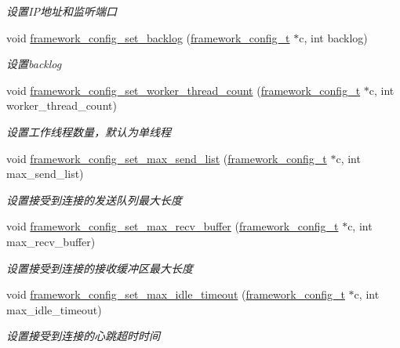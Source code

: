 \begin{DoxyCompactItemize}
\begin{DoxyCompactList}\small\item\em 设置\+I\+P地址和监听端口 \end{DoxyCompactList}\item 
void \hyperlink{a00093_gafdcba98785a6e0c7729c14eac004c1e3_gafdcba98785a6e0c7729c14eac004c1e3}{framework\+\_\+config\+\_\+set\+\_\+backlog} (\hyperlink{a00047_a55b26efa9e6ee05514d087ba2593a54b_a55b26efa9e6ee05514d087ba2593a54b}{framework\+\_\+config\+\_\+t} $\ast$c, int backlog)
\begin{DoxyCompactList}\small\item\em 设置backlog \end{DoxyCompactList}\item 
void \hyperlink{a00093_ga46fc5d54c72138bced5ddd4068ef77e5_ga46fc5d54c72138bced5ddd4068ef77e5}{framework\+\_\+config\+\_\+set\+\_\+worker\+\_\+thread\+\_\+count} (\hyperlink{a00047_a55b26efa9e6ee05514d087ba2593a54b_a55b26efa9e6ee05514d087ba2593a54b}{framework\+\_\+config\+\_\+t} $\ast$c, int worker\+\_\+thread\+\_\+count)
\begin{DoxyCompactList}\small\item\em 设置工作线程数量，默认为单线程 \end{DoxyCompactList}\item 
void \hyperlink{a00093_ga6d3affd6639a3d75920197811c333fac_ga6d3affd6639a3d75920197811c333fac}{framework\+\_\+config\+\_\+set\+\_\+max\+\_\+send\+\_\+list} (\hyperlink{a00047_a55b26efa9e6ee05514d087ba2593a54b_a55b26efa9e6ee05514d087ba2593a54b}{framework\+\_\+config\+\_\+t} $\ast$c, int max\+\_\+send\+\_\+list)
\begin{DoxyCompactList}\small\item\em 设置接受到连接的发送队列最大长度 \end{DoxyCompactList}\item 
void \hyperlink{a00093_ga582e128041da47fa6578aa150b5a615a_ga582e128041da47fa6578aa150b5a615a}{framework\+\_\+config\+\_\+set\+\_\+max\+\_\+recv\+\_\+buffer} (\hyperlink{a00047_a55b26efa9e6ee05514d087ba2593a54b_a55b26efa9e6ee05514d087ba2593a54b}{framework\+\_\+config\+\_\+t} $\ast$c, int max\+\_\+recv\+\_\+buffer)
\begin{DoxyCompactList}\small\item\em 设置接受到连接的接收缓冲区最大长度 \end{DoxyCompactList}\item 
void \hyperlink{a00093_ga22047d5186ce58243e3c4308dd851ab6_ga22047d5186ce58243e3c4308dd851ab6}{framework\+\_\+config\+\_\+set\+\_\+max\+\_\+idle\+\_\+timeout} (\hyperlink{a00047_a55b26efa9e6ee05514d087ba2593a54b_a55b26efa9e6ee05514d087ba2593a54b}{framework\+\_\+config\+\_\+t} $\ast$c, int max\+\_\+idle\+\_\+timeout)
\begin{DoxyCompactList}\small\item\em 设置接受到连接的心跳超时时间 \end{DoxyCompactList}\end{DoxyCompactItemize}


